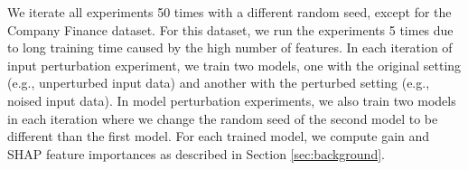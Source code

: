 We iterate all experiments 50 times with a different random seed, except for the Company Finance dataset. For this dataset, we run the experiments 5 times due to long training time caused by the high number of features. In each iteration of input perturbation experiment, we train two models, one with the original setting (e.g., unperturbed input data) and another with the perturbed setting (e.g., noised input data). In model perturbation experiments, we also train two models in each iteration where we change the random seed of the second model to be different than the first model. For each trained model, we compute gain and SHAP feature importances as described in Section \ref{sec:background}. 


